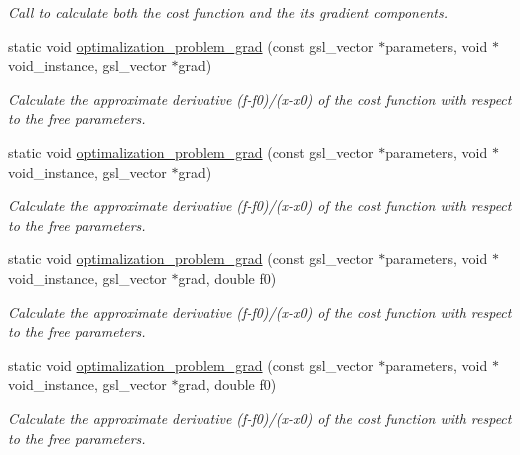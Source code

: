 \begin{DoxyCompactItemize}
\begin{DoxyCompactList}\small\item\em Call to calculate both the cost function and the its gradient components. \end{DoxyCompactList}\item 
static void \hyperlink{class_n___qubit___decomposition_ab03a0f4e7cecacc48fc73999fd9ff16c}{optimalization\+\_\+problem\+\_\+grad} (const gsl\+\_\+vector $\ast$parameters, void $\ast$void\+\_\+instance, gsl\+\_\+vector $\ast$grad)
\begin{DoxyCompactList}\small\item\em Calculate the approximate derivative (f-\/f0)/(x-\/x0) of the cost function with respect to the free parameters. \end{DoxyCompactList}\item 
static void \hyperlink{class_n___qubit___decomposition_a1f5e04ff47aa56af894a20d0a6dff785}{optimalization\+\_\+problem\+\_\+grad} (const gsl\+\_\+vector $\ast$parameters, void $\ast$void\+\_\+instance, gsl\+\_\+vector $\ast$grad)
\begin{DoxyCompactList}\small\item\em Calculate the approximate derivative (f-\/f0)/(x-\/x0) of the cost function with respect to the free parameters. \end{DoxyCompactList}\item 
static void \hyperlink{class_n___qubit___decomposition_aba92bf1617eae42f1669a0c47c7b6b74}{optimalization\+\_\+problem\+\_\+grad} (const gsl\+\_\+vector $\ast$parameters, void $\ast$void\+\_\+instance, gsl\+\_\+vector $\ast$grad, double f0)
\begin{DoxyCompactList}\small\item\em Calculate the approximate derivative (f-\/f0)/(x-\/x0) of the cost function with respect to the free parameters. \end{DoxyCompactList}\item 
static void \hyperlink{class_n___qubit___decomposition_a361ac1cbe8ee38d5e1fd61eb931870bb}{optimalization\+\_\+problem\+\_\+grad} (const gsl\+\_\+vector $\ast$parameters, void $\ast$void\+\_\+instance, gsl\+\_\+vector $\ast$grad, double f0)
\begin{DoxyCompactList}\small\item\em Calculate the approximate derivative (f-\/f0)/(x-\/x0) of the cost function with respect to the free parameters. \end{DoxyCompactList}\end{DoxyCompactItemize}
